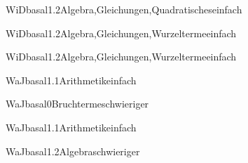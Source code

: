 \documentclass[12pt]{article}
\begin{document}
\begin{Add}{WiD}{basal1.2}{Algebra,Gleichungen,Quadratisches}{einfach}
        
\end{Add}

\begin{Add}{WiD}{basal1.2}{Algebra,Gleichungen,Wurzelterme}{einfach}
        
\end{Add}

\begin{Add}{WiD}{basal1.2}{Algebra,Gleichungen,Wurzelterme}{einfach}
        
\end{Add}


\begin{Add}{WaJ}{basal1.1}{Arithmetik}{einfach}
\end{Add}

\begin{Add}{WaJ}{basal0}{Bruchterme}{schwieriger}
\end{Add}

\begin{Add}{WaJ}{basal1.1}{Arithmetik}{einfach}
\end{Add}

\begin{Add}{WaJ}{basal1.2}{Algebra}{schwieriger}
\end{Add}
\end{document}

